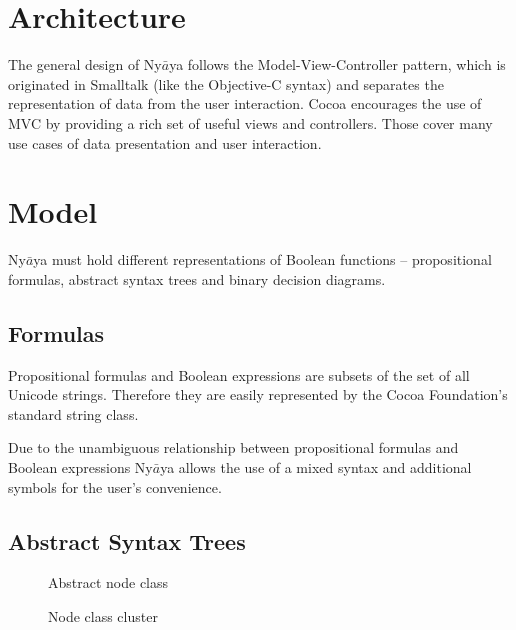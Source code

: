 
\section{Architecture}

The general design of Ny$\bar{a}$ya follows the Model-View-Controller pattern,
which is originated in Smalltalk \cite[p.4]{GAMMAETAL} (like the Objective-C syntax)
and separates the representation of data from the user interaction.
Cocoa  encourages the use of MVC by providing a rich set of useful views and controllers.
Those cover many use cases of data presentation and user interaction. 

\section{Model}

Ny$\bar{a}$ya must hold different representations of Boolean functions – propositional formulas, abstract syntax trees and binary decision diagrams. 

\subsection{Formulas}
Propositional formulas and Boolean expressions are subsets of the set of all Unicode strings. 
Therefore they are easily represented by the Cocoa Foundation's  
standard string class. 

Due to the unambiguous relationship between propositional formulas and Boolean expressions Ny$\bar{a}$ya allows the use of a mixed syntax and additional symbols for the user's convenience. 


\subsection{Abstract Syntax Trees}

\begin{figure}[htbp]
\begin{center}
\caption{Abstract node class}
\label{fig:NyayaNodeCluster}
\end{center}
\end{figure}

\begin{figure}[htbp]
\begin{center}
\caption{Node class cluster}
\label{fig:NyayaNodeCluster}
\end{center}
\end{figure}

